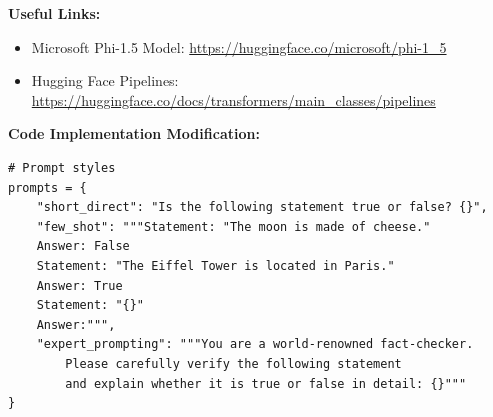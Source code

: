 \documentclass[11pt, oneside]{article}   	%
\begin{document}
\textbf{Useful Links:}
\begin{itemize}
    \item Microsoft Phi-1.5 Model: \href{https://huggingface.co/microsoft/phi-1_5}{https://huggingface.co/microsoft/phi-1\_5}
    \item Hugging Face Pipelines: \href{https://huggingface.co/docs/transformers/main_classes/pipelines}{https://huggingface.co/docs/transformers/main\_classes/pipelines}
\end{itemize}

\textbf{Code Implementation Modification: }
\begin{verbatim}
# Prompt styles
prompts = {
    "short_direct": "Is the following statement true or false? {}",
    "few_shot": """Statement: "The moon is made of cheese."
    Answer: False
    Statement: "The Eiffel Tower is located in Paris."
    Answer: True
    Statement: "{}"
    Answer:""",
    "expert_prompting": """You are a world-renowned fact-checker. 
        Please carefully verify the following statement 
        and explain whether it is true or false in detail: {}"""
}
\end{verbatim}
\end{document}

